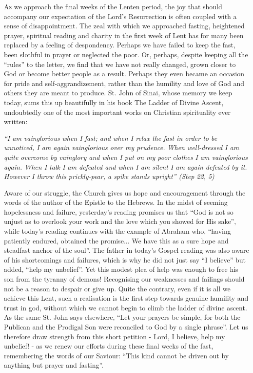 



\lettrine{A}{s} we approach the final weeks of the Lenten period, the joy that should accompany our expectation of the Lord's Resurrection is often coupled with a sense of disappointment.
The zeal with which we approached fasting, heightened prayer, spiritual reading and charity in the first week of Lent has for many been replaced by a feeling of despondency. Perhaps we have failed to keep the fast, been slothful in prayer or neglected the poor. Or, perhaps, despite keeping all the ``rules'' to the letter, we find that we have not really changed, grown closer to God or become better people as a result.
Perhaps they even became an occasion for pride and self-aggrandizement, rather than the humility and love of God and others they are meant to produce. St. John of Sinai, whose memory we keep today, sums this up beautifully in his book The Ladder of Divine Ascent, undoubtedly one of the most important works on Christian spirituality ever written:

\begin{center}
    \textit{``I am vainglorious when I fast; and when I relax the fast in order to be unnoticed, I am again vainglorious over my prudence. When well-dressed I am quite overcome by vainglory and when I put on my poor clothes I am vainglorious again. When I talk I am defeated and when I am silent I am again defeated by it. However I throw this prickly-pear, a spike stands upright'' (Step 22, 5)}
\end{center}

    Aware of our struggle, the Church gives us hope and encouragement through the words of the author of the Epistle to the Hebrews. In the midst of seeming hopelessness and failure, yesterday's reading promises us that ``God is not so unjust as to overlook your work and the love which you showed for His sake'', while today's reading continues with the example of Abraham who, ``having patiently endured, obtained the promise... We have this as a sure hope and steadfast anchor of the soul''. The father in today's Gospel reading was also aware of his shortcomings and failures, which is why he did not just say ``I believe'' but added, ``help my unbelief''. Yet this modest plea of help was enough to free his son from the tyranny of demons!
    Recognising our weaknesses and failings should not be a reason to despair or give up. Quite the contrary, even if it is all we achieve this Lent, such a realisation is the first step towards genuine humility and trust in god, without which we cannot begin to climb the ladder of divine ascent. As the same St. John says elsewhere, ``Let your prayers be simple, for both the Publican and the Prodigal Son were reconciled to God by a single phrase''. Let us therefore draw strength from this short petition - Lord, I believe, help my unbelief! - as we renew our efforts during these final weeks of the fast, remembering the words of our Saviour: ``This kind cannot be driven out by anything but prayer and fasting''.


